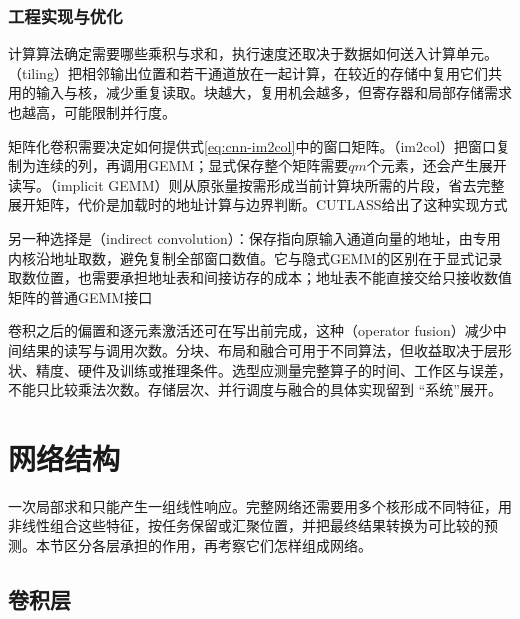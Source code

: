\subsubsection{工程实现与优化}
\label{sec:cnn-engineering}

计算算法确定需要哪些乘积与求和，执行速度还取决于数据如何送入计算单元。（tiling）把相邻输出位置和若干通道放在一起计算，在较近的存储中复用它们共用的输入与核，减少重复读取。块越大，复用机会越多，但寄存器和局部存储需求也越高，可能限制并行度。

矩阵化卷积需要决定如何提供式\eqref{eq:cnn-im2col}中的窗口矩阵。（im2col）把窗口复制为连续的列，再调用GEMM；显式保存整个矩阵需要$qm$个元素，还会产生展开读写。（implicit GEMM）则从原张量按需形成当前计算块所需的片段，省去完整展开矩阵，代价是加载时的地址计算与边界判断。CUTLASS给出了这种实现方式

另一种选择是（indirect convolution）：保存指向原输入通道向量的地址，由专用内核沿地址取数，避免复制全部窗口数值。它与隐式GEMM的区别在于显式记录取数位置，也需要承担地址表和间接访存的成本；地址表不能直接交给只接收数值矩阵的普通GEMM接口

卷积之后的偏置和逐元素激活还可在写出前完成，这种（operator fusion）减少中间结果的读写与调用次数。分块、布局和融合可用于不同算法，但收益取决于层形状、精度、硬件及训练或推理条件。选型应测量完整算子的时间、工作区与误差，不能只比较乘法次数。存储层次、并行调度与融合的具体实现留到
“系统”展开。

\FloatBarrier

\section{网络结构}
\label{sec:cnn-structure}

一次局部求和只能产生一组线性响应。完整网络还需要用多个核形成不同特征，用非线性组合这些特征，按任务保留或汇聚位置，并把最终结果转换为可比较的预测。本节区分各层承担的作用，再考察它们怎样组成网络。

\subsection{卷积层}
\label{sec:cnn-layer}

